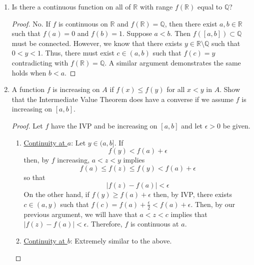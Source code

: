 \begin{enumerate}
    \item Is there a continuous function on all of \( \mathbb{R} \) with range \( f(\mathbb{R}) \) equal to \( \mathbb{Q} \)?
    \begin{proof}
    No. If \( f \) is continuous on \( \mathbb{R} \) and \( f(\mathbb{R}) = \mathbb{Q} \), then there exist \( a,b \in \mathbb{R} \) such that  \( f(a) = 0 \) and \( f(b) =1 \). Suppose \( a < b \). Then \( f([a,b]) \subset \mathbb{Q} \) must be connected. However, we know that there exists \( y \in \mathbb{R} \setminus \mathbb{Q} \) such that \( 0 < y < 1 \). Thus, there must exist \( c \in (a,b) \) such that \( f(c) = y \) contradicting with \( f(\mathbb{R}) = \mathbb{Q} \). A similar argument demonstrates the same holds when \( b < a \).
    \end{proof}
    
    \item A function \( f \) is increasing on \( A \) if \( f(x) \leq f(y) \) for all \( x < y \) in \( A \). Show that the Intermediate Value Theorem does have a converse if we assume \( f \) is increasing on \( [a,b] \).
    
    \begin{proof}
    Let \( f \) have the IVP and be increasing on \( [a,b] \) and let \( \epsilon > 0 \) be given.
    \begin{enumerate}
    
    \item \underline{Continuity at \( a \)}: Let \( y \in (a,b] \). If
    \[
    f(y) < f(a) + \epsilon
    \]
    then, by \( f \) increasing, \( a < z < y \) implies
    \[
    f(a) \leq f(z) \leq f(y) < f(a) + \epsilon
    \]
    so that
    \[
    \vert f(z) - f(a) \vert < \epsilon
    \]
    On the other hand, if \( f(y) \geq f(a) + \epsilon \) then, by IVP, there exists \( c \in (a,y) \) such that \( f(c) = f(a) + \frac{\epsilon}{2} < f(a) + \epsilon \). Then, by our previous argument, we will have that \( a < z < c \) implies that \( \vert f(z) - f(a) \vert < \epsilon \). Therefore, \( f \) is continuous at \( a \). 
    
    \item \underline{Continuity at \( b \)}: Extremely similar to the above.
    

\end{enumerate}
\end{proof}
\end{enumerate}
